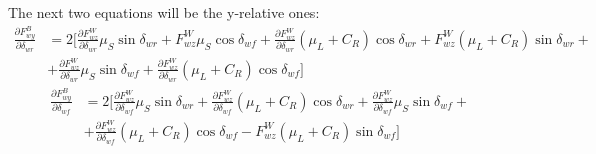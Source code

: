 \documentclass[a4paper,12pt,titlepage]{report}
\begin{document}
	The next two equations will be the y-relative ones:
		\begin{equation} \label{Fwy su deltaR}
			\begin{split}
				\frac{\partial F_{wy}^{B}}{\partial \delta_{wr}} &= 2 [\frac{\partial F_{wz}^{W}}{\partial \delta_{wr}} \mu_{S} \sin \delta_{wr} + F_{wz}^{W} \mu_{S}\cos\delta_{wf} + \frac{\partial F_{wz}^{W}}{\partial \delta_{wr}} (\mu_{L}+C_{R}) \cos\delta_{wr} + F_{wz}^{W}(\mu_{L}+C_{R}) \sin\delta_{wr}+ \\ &+ \frac{\partial F_{wz}^{W}}{\partial \delta_{wr}} \mu_{S} \sin \delta_{wf} + \frac{\partial F_{wz}^{W}}{\partial \delta_{wr}} (\mu_{L}+C_{R})\cos\delta_{wf}]
			\end{split}
		\end{equation}
		\begin{equation} \label{Fwy su deltaF}
			\begin{split}
				\frac{\partial F_{wy}^{B}}{\partial \delta_{wf}} &= 2 [\frac{\partial F_{wz}^{W}}{\partial \delta_{wf}} \mu_{S} \sin \delta_{wr} + \frac{\partial F_{wz}^{W}}{\partial \delta_{wf}} (\mu_{L}+C_{R}) \cos\delta_{wr} + \frac{\partial F_{wz}^{W}}{\partial \delta_{wf}} \mu_{S} \sin \delta_{wf}+ \\ &+ \frac{\partial F_{wz}^{W}}{\partial \delta_{wf}} (\mu_{L}+C_{R})\cos\delta_{wf} - F_{wz}^{W} (\mu_{L}+C_{R}) \sin\delta_{wf}]
			\end{split}
		\end{equation}
	\begin{comment}
	\subsection{Matrix $B_{2}$}
	Considering that our \textit{disturbance} variable ($\delta_{wf}$) is always a steering angle as the \textit{control} one ($\delta_{wr}$), the processing phase of Matrix $B_{2}$ was exactly the same as the Matrix $B_{1}$ one. \\ The final result is reported down here:
		\begin{equation}
			B_{2}=
			\begin{bmatrix}
			\frac{\partial\dot{\beta}_{u}^{B}}{\partial\delta_{f}^{B}} \\
			\frac{\partial\dot{\omega}_{z}^{B}}{\partial\delta_{f}^{B}} 
			\end{bmatrix} =
			\begin{bmatrix}
			 -\frac{1}{mV_{0B}}\{-\sin\beta_{u}\frac{\partial F_{wx}^{B}}{\partial \delta_{wf}} + \cos\beta_{u}\frac{\partial F_{wy}^{B}}{\partial \delta_{wf}}\} \\
		\frac{1}{J_{z}} \frac{\partial \tau_{z}^{B}}{\partial\delta_{wf}} = \frac{1}{J_{z}} \{ \sum\limits_{i=1}^4 C_{R}F_{wz_{i}}^{w} r_{x_{i}} + \sum\limits_{i=1}^4 F_{wz_{i}}^{w} \mu(\lambda_{0}) \frac{\omega_{i} r}{v_{max}}r_{x_{i}} \}
			\end{bmatrix}
		\end{equation}
	For the elaboration of all the partial derivatives above, refer to subsection \ref{B1}.
	\end{comment}
\end{document}
